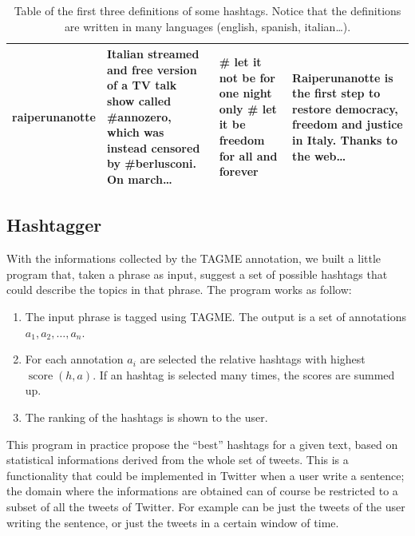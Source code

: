 \documentclass[a4paper,11pt,oneside]{article}
\DeclareMathOperator{\score}{score}
\begin{document}
\begin{table}[h]
\begin{tabular}{ | l | p{4cm} | p{4cm} | p{4cm} |}
raiperunanotte & \footnotesize{Italian streamed and free version of a TV talk show called \#annozero, which was instead censored by \#berlusconi. On march\dots} & \footnotesize{\# let it not be for one night only \# let it be freedom for all and forever} & \footnotesize{Raiperunanotte is the first step to restore democracy, freedom and justice in Italy. Thanks to the web\dots}\\
 \hline
    \end{tabular}
    \caption{Table of the first three definitions of some hashtags. Notice that the definitions are written in many languages (english, spanish, italian\dots).}
    \label{tab:hashDef}
\end{table}


\subsection{Hashtagger}
\label{sec:tagger}
With the informations collected by the TAGME annotation, we built a little program that, taken a phrase as input, suggest a set of possible hashtags that could describe the topics in that phrase.
The program works as follow:
\begin{enumerate}
\item The input phrase is tagged using TAGME. The output is a set of annotations $a_1, a_2,\ldots, a_n$.
\item For each annotation $a_i$ are selected the relative hashtags with highest $\score(h,a)$. If an hashtag is selected many times, the scores are summed up.
\item The ranking of the hashtags is shown to the user.
\end{enumerate}

This program in practice propose the ``best'' hashtags for a given text, based on statistical informations derived from the whole set of tweets. This is a functionality that could be implemented in Twitter when a user write a sentence; the domain where the informations are obtained can of course be restricted to a subset of all the tweets of Twitter. For example  can be just the tweets of the user writing the sentence, or just the tweets in a certain window of time.  
\end{document}

